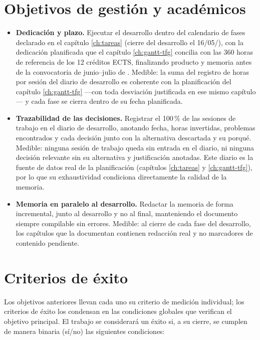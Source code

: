 \section{Objetivos de gestión y académicos}
\label{sec:objetivos-gestion}

\begin{itemize}
  \item \textbf{Dedicación y plazo.}
        Ejecutar el desarrollo dentro del calendario de fases declarado en el capítulo \ref{ch:tareas} (cierre del desarrollo el 16/05/\thesisYear), con la dedicación planificada que el capítulo \ref{ch:gantt-tfg} concilia con las 360 horas de referencia de los 12 créditos \ac{ECTS}, finalizando producto y memoria antes de la convocatoria de junio--julio de \thesisYear.
        Medible: la suma del registro de horas por sesión del diario de desarrollo es coherente con la planificación del capítulo \ref{ch:gantt-tfg} —con toda desviación justificada en ese mismo capítulo— y cada fase se cierra dentro de su fecha planificada.
  \item \textbf{Trazabilidad de las decisiones.}
        Registrar el 100\,\% de las sesiones de trabajo en el diario de desarrollo, anotando fecha, horas invertidas, problemas encontrados y cada decisión junto con la alternativa descartada y su porqué.
        Medible: ninguna sesión de trabajo queda sin entrada en el diario, ni ninguna decisión relevante sin su alternativa y justificación anotadas.
        Este diario es la fuente de datos real de la planificación (capítulos \ref{ch:tareas} y \ref{ch:gantt-tfg}), por lo que su exhaustividad condiciona directamente la calidad de la memoria.
  \item \textbf{Memoria en paralelo al desarrollo.}
        Redactar la memoria de forma incremental, junto al desarrollo y no al final, manteniendo el documento siempre compilable sin errores.
        Medible: al cierre de cada fase del desarrollo, los capítulos que la documentan contienen redacción real y no marcadores de contenido pendiente.
\end{itemize}

\section{Criterios de éxito}
\label{sec:criterios-exito}

Los objetivos anteriores llevan cada uno su criterio de medición individual; los criterios de éxito los condensan en las condiciones globales que verifican el objetivo principal.
El trabajo se considerará un éxito si, a su cierre, se cumplen de manera binaria (sí/no) las siguientes condiciones:

